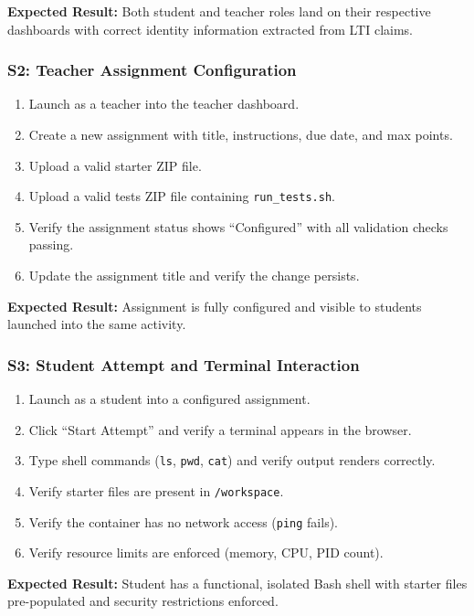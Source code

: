 \documentclass[12pt, letterpaper]{article}
\begin{document}
\textbf{Expected Result:} Both student and teacher roles land on their respective dashboards with correct identity information extracted from LTI claims.

\subsubsection{S2: Teacher Assignment Configuration}

\begin{enumerate}
    \item Launch as a teacher into the teacher dashboard.
    \item Create a new assignment with title, instructions, due date, and max points.
    \item Upload a valid starter ZIP file.
    \item Upload a valid tests ZIP file containing \texttt{run\_tests.sh}.
    \item Verify the assignment status shows ``Configured'' with all validation checks passing.
    \item Update the assignment title and verify the change persists.
\end{enumerate}

\textbf{Expected Result:} Assignment is fully configured and visible to students launched into the same activity.

\subsubsection{S3: Student Attempt and Terminal Interaction}

\begin{enumerate}
    \item Launch as a student into a configured assignment.
    \item Click ``Start Attempt'' and verify a terminal appears in the browser.
    \item Type shell commands (\texttt{ls}, \texttt{pwd}, \texttt{cat}) and verify output renders correctly.
    \item Verify starter files are present in \texttt{/workspace}.
    \item Verify the container has no network access (\texttt{ping} fails).
    \item Verify resource limits are enforced (memory, CPU, PID count).
\end{enumerate}

\textbf{Expected Result:} Student has a functional, isolated Bash shell with starter files pre-populated and security restrictions enforced.
\end{document}
